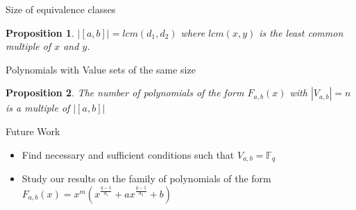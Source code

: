 \documentclass{beamer}
\newtheorem{proposition}{Proposition}
\begin{document}
\begin{frame}{Size of equivalence classes}
  
  \begin{proposition}
    $|[a, b]| = lcm(d_1,d_2)$ where $lcm(x,y)$ is the least common multiple of $x$ and $y$.
  \end{proposition}
\end{frame}

\begin{frame}{Polynomials with Value sets of the same size}
  \begin{proposition}
    The number of polynomials of the form $F_{a, b}(x)$ with $|V_{a, b}| = n$ is a multiple of $|[a, b]|$
  \end{proposition}
\end{frame}

\begin{frame}{Future Work}
  \begin{itemize}
    \item Find necessary and sufficient conditions such that $V_{a,b} = \mathbb{F}_q$
    \item Study our results on the family of polynomials of the form $F_{a,b}(x) = x^m(x^{\frac{q-1}{d_1}} + ax^{\frac{q-1}{d_2}} +b)$
  \end{itemize}
\end{frame}

\end{document}
